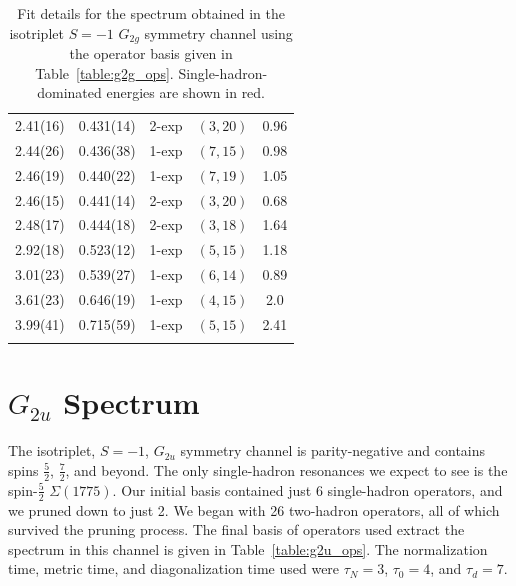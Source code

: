 \begin{longtabu}{c|c|c|c|c}
    2.41(16)&0.431(14)&2{-}exp&$(3, 20)$&0.96\\
    2.44(26)&0.436(38)&1{-}exp&$(7, 15)$&0.98\\
    2.46(19)&0.440(22)&1{-}exp&$(7, 19)$&1.05\\
    2.46(15)&0.441(14)&2{-}exp&$(3, 20)$&0.68\\
    2.48(17)&0.444(18)&2{-}exp&$(3, 18)$&1.64\\
    2.92(18)&0.523(12)&1{-}exp&$(5, 15)$&1.18\\
    3.01(23)&0.539(27)&1{-}exp&$(6, 14)$&0.89\\
    3.61(23)&0.646(19)&1{-}exp&$(4, 15)$&2.0\\
    \rowfont{\color{red}}
    3.99(41)&0.715(59)&1{-}exp&$(5, 15)$&2.41\\
    \caption{Fit details for the spectrum obtained in the isotriplet $S=-1$ $G_{2g}$ symmetry channel using the operator basis given in Table~\ref{table:g2g_ops}. Single-hadron-dominated energies are shown in red.}\label{table:g2g_fits}
\end{longtabu}
\renewcommand{\arraystretch}{1.5}

\section{$G_{2u}$ Spectrum}
The isotriplet, $S=-1$, $G_{2u}$ symmetry channel is parity-negative and contains spins $\frac{5}{2}$, $\frac{7}{2}$, and beyond. The only single-hadron resonances we expect to see is the spin-$\frac{5}{2}$ $\Sigma(1775)$. Our initial basis contained just 6 single-hadron operators, and we pruned down to just 2. We began with 26 two-hadron operators, all of which survived the pruning process. The final basis of operators used extract the spectrum in this channel is given in Table~\ref{table:g2u_ops}. The normalization time, metric time, and diagonalization time used were $\tau_N=3$, $\tau_0=4$, and $\tau_d=7$.

